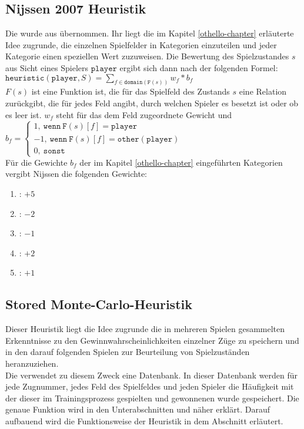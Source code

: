 \subsection{Nijssen 2007 Heuristik}
\label{nissen2007H}
Die  wurde aus \cite{nijssen_2007} übernommen. Ihr liegt die im Kapitel \ref{othello-chapter} erläuterte Idee zugrunde, die einzelnen Spielfelder in Kategorien einzuteilen und jeder Kategorie einen speziellen Wert zuzuweisen. Die Bewertung des Spielzustandes $s$ aus Sicht eines Spielers $\mathtt{player}$ ergibt sich dann nach der folgenden Formel:  \vspace{0.25cm}\\ $\mathtt{heuristic}(\mathtt{player}, S) = \sum\limits_{f \in \mathtt{domain}(\mathtt{F}(s))}  w_{f} * b_{f}$ \vspace{0.25cm}\\$F(s)$ ist eine Funktion ist, die für das Spielfeld des Zustands $s$ eine Relation zurückgibt, die für jedes Feld angibt, durch welchen Spieler es besetzt ist oder ob es leer ist. $w_{f}$ steht für das dem Feld zugeordnete Gewicht und \vspace{0.25cm}\\$b_{f} = \begin{cases} 1 \mathtt{,\ wenn\ F}(s)[f] = \mathtt{player} \\ -1 \mathtt{,\ wenn\ F}(s)[f] = \mathtt{other(player)} \\ 0 \mathtt{,\ sonst} \end{cases}$
\vspace{0.25cm}\\Für die Gewichte $b_{f}$ der im Kapitel \ref{othello-chapter} eingeführten Kategorien vergibt Nijssen die folgenden Gewichte:
\begin{enumerate}
\item {}: $+5$
\item {}: $-2$
\item {}: $-1$
\item {}: $+2$
\item {}: $+1$
\end{enumerate}
\subsection{Stored Monte-Carlo-Heuristik}
\label{impl:stored-mc}
Dieser Heuristik liegt die Idee zugrunde die in mehreren Spielen gesammelten Erkenntnisse zu den Gewinnwahrscheinlichkeiten einzelner Züge zu speichern und in den darauf folgenden Spielen zur Beurteilung von Spielzuständen heranzuziehen.
\\Die {} verwendet zu diesem Zweck eine Datenbank. In dieser Datenbank werden für jede Zugnummer, jedes Feld des Spielfeldes und jeden Spieler die Häufigkeit mit der dieser im Trainingsprozess gespielten und gewonnenen wurde gespeichert. Die genaue Funktion wird in den Unterabschnitten  und  näher erklärt. Darauf aufbauend wird die Funktionsweise der Heuristik in dem Abschnitt  erläutert.
